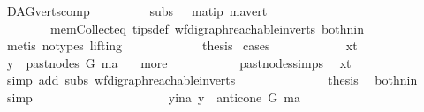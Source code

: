\begin{isabellebody}
\ DAG{\isachardot}{\kern0pt}verts{\isacharunderscore}{\kern0pt}comp{}\ \isanewline
\ \ \ \ \ \ \ \ subs\ {}\ \ ma{\isacharunderscore}{\kern0pt}tip\ ma{\isacharunderscore}{\kern0pt}vert\ \isanewline
\ \ \ \ \ \ \ \ mem{\isacharunderscore}{\kern0pt}Collect{\isacharunderscore}{\kern0pt}eq\ tips{\isacharunderscore}{\kern0pt}def\ wf{\isacharunderscore}{\kern0pt}digraph{\isachardot}{\kern0pt}reachable{}{\isacharunderscore}{\kern0pt}in{\isacharunderscore}{\kern0pt}verts{\isacharparenleft}{\kern0pt}{}{\isacharparenright}{\kern0pt}\ both{\isacharunderscore}{\kern0pt}nin\isanewline
\ \ \ \ \ \ \ \ \ \ \isamarkupfalse%
\ {\isacharparenleft}{\kern0pt}metis\ {\isacharparenleft}{\kern0pt}no{\isacharunderscore}{\kern0pt}types{\isacharcomma}{\kern0pt}\ lifting{\isacharparenright}{\kern0pt}{\isacharparenright}{\kern0pt}\ \isanewline
\ \ \ \ \ \ \ \ \isamarkupfalse%
\ \isamarkupfalse%
\ {\isacharquery}{\kern0pt}thesis\ \isamarkupfalse%
{\isacharparenleft}{\kern0pt}cases{\isacharparenright}{\kern0pt}\isanewline
\ \ \ \ \ \ \ \ \ \ \isamarkupfalse%
\ x{\isacharunderscore}{\kern0pt}t\ \isanewline
\ \ \ \ \ \ \ \ \ \ \isamarkupfalse%
\ {\isachardoublequoteopen}y\ {\isasymin}\ past{\isacharunderscore}{\kern0pt}nodes\ G\ ma{\isachardoublequoteclose}\ \isamarkupfalse%
\ {}{\isacharparenleft}{\kern0pt}{}{\isacharparenright}{\kern0pt}\ more\ \isanewline
\ \ \ \ \ \ \ \ \ \ past{\isacharunderscore}{\kern0pt}nodes{\isachardot}{\kern0pt}simps\ \isamarkupfalse%
\ x{\isacharunderscore}{\kern0pt}t\isanewline
\ \ \ \ \ \ \ \ \ \ \ \ \isamarkupfalse%
\ {\isacharparenleft}{\kern0pt}simp\ add{\isacharcolon}{\kern0pt}\ subs\ wf{\isacharunderscore}{\kern0pt}digraph{\isachardot}{\kern0pt}reachable{}{\isacharunderscore}{\kern0pt}in{\isacharunderscore}{\kern0pt}verts{\isacharparenleft}{\kern0pt}{}{\isacharparenright}{\kern0pt}{\isacharparenright}{\kern0pt}\ \isanewline
\ \ \ \ \ \ \ \ \ \ \isamarkupfalse%
\ \isamarkupfalse%
\ {\isacharquery}{\kern0pt}thesis\ \isamarkupfalse%
\ both{\isacharunderscore}{\kern0pt}nin\ \isamarkupfalse%
\ simp\ \isanewline
\ \ \ \ \ \ \ \ \isamarkupfalse%
\isanewline
\ \ \ \ \ \ \ \ \ \ \isamarkupfalse%
\ y{\isacharunderscore}{\kern0pt}ina{\isacharcolon}{\kern0pt}\ {\isachardoublequoteopen}y\ {\isasymin}\ anticone\ G\ ma{\isachardoublequoteclose}\ \isanewline

\end{isabellebody}
